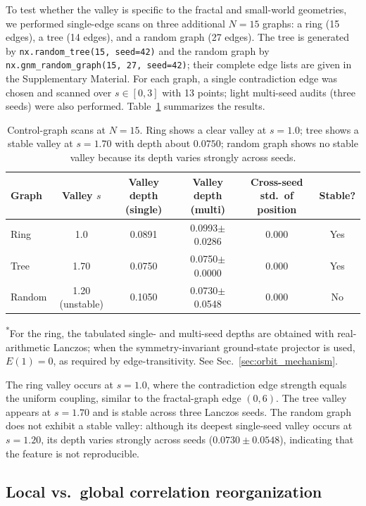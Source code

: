 \documentclass[aps,prb,reprint,superscriptaddress]{revtex4-2}
\begin{document}
To test whether the valley is specific to the fractal and small-world geometries, we performed single-edge scans on three additional $N=15$ graphs: a ring (15 edges), a tree (14 edges), and a random graph (27 edges). The tree is generated by \texttt{nx.random\_tree(15, seed=42)} and the random graph by \texttt{nx.gnm\_random\_graph(15, 27, seed=42)}; their complete edge lists are given in the Supplementary Material. For each graph, a single contradiction edge was chosen and scanned over $s\in[0,3]$ with 13 points; light multi-seed audits (three seeds) were also performed. Table~\ref{tab:control_graphs} summarizes the results.

\begin{table}[t]
\centering
\caption{Control-graph scans at $N=15$. Ring shows a clear valley at $s=1.0$; tree shows a stable valley at $s=1.70$ with depth about $0.0750$; random graph shows no stable valley because its depth varies strongly across seeds.}
\label{tab:control_graphs}
\begin{tabular}{lccccc}
\toprule
Graph & Valley $s$ & Valley depth (single) & Valley depth (multi) & Cross-seed std.\ of position & Stable? \\
\midrule
Ring & 1.0 & 0.0891 & 0.0993$\pm$0.0286 & 0.000 & Yes \\
Tree & 1.70 & 0.0750 & 0.0750$\pm$0.0000 & 0.000 & Yes \\
Random & 1.20 (unstable) & 0.1050 & 0.0730$\pm$0.0548 & 0.000 & No \\
\bottomrule
\end{tabular}
\end{table}

\noindent\textsuperscript{*}For the ring, the tabulated single- and multi-seed depths are obtained with real-arithmetic Lanczos; when the symmetry-invariant ground-state projector is used, \(E(1)=0\), as required by edge-transitivity. See Sec.~\ref{sec:orbit_mechanism}.

The ring valley occurs at $s=1.0$, where the contradiction edge strength equals the uniform coupling, similar to the fractal-graph edge $(0,6)$. The tree valley appears at $s=1.70$ and is stable across three Lanczos seeds. The random graph does not exhibit a stable valley: although its deepest single-seed valley occurs at $s=1.20$, its depth varies strongly across seeds ($0.0730\pm0.0548$), indicating that the feature is not reproducible.

\subsection{Local vs.\ global correlation reorganization}
\label{sec:local_global}
\end{document}
